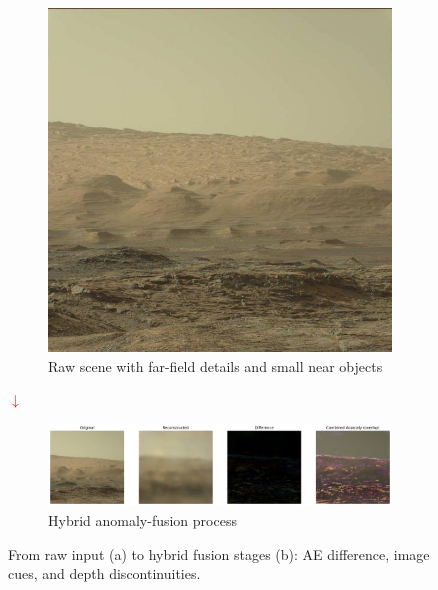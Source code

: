 \documentclass[12pt]{article}
\begin{document}
\begin{figure}[H]
  \centering
  \begin{subfigure}[t]{0.7\textwidth}
    \centering
    \includegraphics[width=\linewidth]{curiosity_hills_small_objects.jpg}
    \caption{Raw scene with far-field details and small near objects}
  \end{subfigure}
  \vspace{0.5cm}
  \begin{center}
    \textcolor{red}{\Large $\downarrow$}
  \end{center}
  \vspace{0.5cm}
  \begin{subfigure}[t]{1.0\textwidth}
    \centering
    \includegraphics[width=\linewidth]{ae_diff_norm_hills_combined.png}
    \caption{Hybrid anomaly-fusion process}
  \end{subfigure}
  \caption{From raw input (a) to hybrid fusion stages (b): AE difference, image cues, and depth discontinuities.}
  \label{fig:far-small-detail}
\end{figure}
\FloatBarrier
\end{document}
